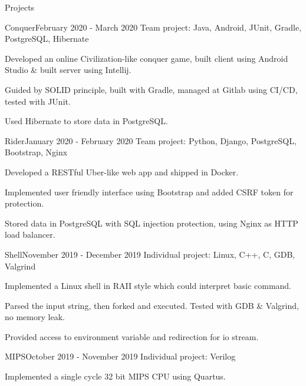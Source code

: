 \documentclass{resume} %
\begin{document}
\begin{rSection}{Projects}
    \begin{rSubsection}{Conquer}{February 2020 - March 2020}
        {Team project: Java, Android, JUnit, Gradle, PostgreSQL, Hibernate}{}
        \item Developed an online Civilization-like conquer game, built client using Android Studio \& built server using Intellij. 
        \item Guided by SOLID principle, built with Gradle, managed at Gitlab using CI/CD, tested with JUnit.
        \item Used Hibernate to store data in PostgreSQL.
        \end{rSubsection}

    \begin{rSubsection}{Rider}{January 2020 - February 2020}
        {Team project: Python, Django, PostgreSQL, Bootstrap, Nginx}{}
        \item Developed a RESTful Uber-like web app and shipped in Docker.
        \item Implemented user friendly interface using Bootstrap and added CSRF token for protection.
        \item Stored data in PostgreSQL with SQL injection protection, using Nginx as HTTP load balancer.
        \end{rSubsection}

    \begin{rSubsection}{Shell}{November 2019 - December 2019}
    {Individual project: Linux, C++, C, GDB, Valgrind}{}
    \item Implemented a Linux shell in RAII style which could interpret basic command.
    \item Parsed the input string, then forked and executed. Tested with GDB \& Valgrind, no memory leak.
    \item Provided access to environment variable and redirection for io stream.
    \end{rSubsection}

    \begin{rSubsection}{MIPS}{October 2019 - November 2019}
        {Individual project: Verilog}{}
        \item Implemented a single cycle 32 bit MIPS CPU using Quartus.
        \end{rSubsection}
    



\end{rSection}
\end{document}
